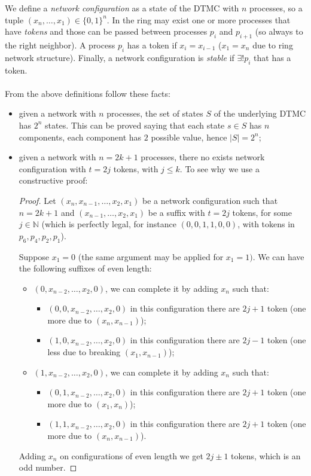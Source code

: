 We define a \emph{network configuration} as a state of the DTMC with
$n$ processes, so a tuple $(x_n, \ldots, x_1) \in \{0,1\}^n$. In the
ring may exist one or more processes that have \emph{tokens} and those
can be passed between processes $p_i$ and $p_{i+1}$ (so always to the
right neighbor). A process $p_i$ has a token if $x_i = x_{i-1}$ ($x_1
= x_n$ due to ring network structure). Finally, a network
configuration is \emph{stable} if $\exists! p_i$ that has a token.
\\\\
From the above definitions follow these facts:
\begin{itemize}
\item given a network with $n$ processes, the set of states $S$ of the
  underlying DTMC has $2^n$ states. This can be proved saying
  that each state $s\in S$ has $n$ components, each component has $2$
  possible value, hence $|S| = 2^n$;
\item given a network with $n = 2k+1$ processes, there no exists
  network configuration with $t=2j$ tokens, with $j \leq k$. To see
  why we use a constructive proof:
  \begin{proof} Let $(x_n,x_{n-1}, \ldots, x_2,x_1)$ be a network
    configuration such that $n=2k+1$ and $(x_{n-1}, \ldots,x_2, x_1)$
    be a suffix with $t=2j$ tokens, for some $j\in \mathbb{N} $ (which
    is perfectly legal, for instance $(0,0,1,1,0,0)$, with tokens in
    $p_6, p_4, p_2, p_1$).

    Suppose $x_1 = 0$ (the same argument may be applied for
    $x_1=1)$. We can have the following suffixes of even length:
    \begin{itemize}
    \item $(0,x_{n-2},\ldots, x_2,0)$, we can complete it by adding
      $x_n$ such that:
      \begin{itemize}
      \item $(0,0,x_{n-2},\ldots, x_2, 0)$ in this configuration there
        are $2j+1$ token (one more due to $(x_n,x_{n-1})$);
      \item $(1,0,x_{n-2},\ldots, x_2,0)$ in this configuration there
        are $2j-1$ token (one less due to breaking $(x_1,x_{n-1})$);
      \end{itemize}
    \item $(1,x_{n-2},\ldots, x_2,0)$, we can complete it by adding
      $x_n$ such that:
      \begin{itemize}
      \item $(0,1,x_{n-2},\ldots, x_2, 0)$ in this configuration there
        are $2j+1$ token (one more due to $(x_1,x_n)$);
      \item $(1,1,x_{n-2},\ldots, x_2,0)$ in this configuration there
        are $2j+1$ token (one more due to $(x_n,x_{n-1})$).
      \end{itemize}
    \end{itemize}
    Adding $x_n$ on configurations of even length we get $2j\pm 1 $
    tokens, which is an odd number.
  \end{proof}
\end{itemize}

